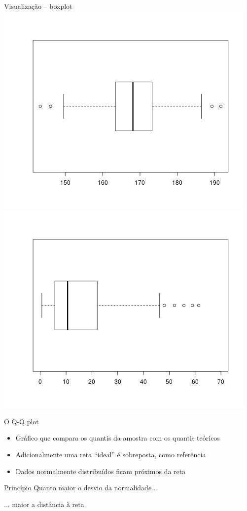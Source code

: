 \documentclass{beamer}
\begin{document}
\begin{frame}{\scriptsize Visualização -- boxplot}
  \includegraphics[height=.5\textheight]{Cap37-38/normal-bp}
  \includegraphics[height=.5\textheight]{Cap37-38/lognormal-bp}
\end{frame}

\begin{frame}{\scriptsize O Q-Q plot}
  \begin{itemize}
    \footnotesize
  \item Gráfico que compara os quantis da amostra com os quantis teóricos
  \item Adicionalmente uma reta ``ideal'' é sobreposta, como referência
    \bigskip
  \item Dados normalmente distribuídos ficam próximos da reta
  \end{itemize}
  \bigskip
  \begin{block}{Princípio}
    \footnotesize
    Quanto maior o desvio da normalidade...

    \bigskip
    ... maior a distância à reta
  \end{block}
\end{frame}
\end{document}
